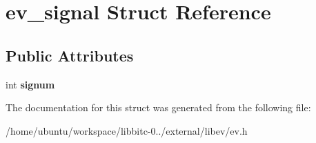 \hypertarget{structev__signal}{\section{ev\-\_\-signal Struct Reference}
\label{structev__signal}
}
\subsection*{Public Attributes}
\begin{DoxyCompactItemize}
\item 
\hypertarget{structev__signal_a6e2aa67420522727edd77c291bc29cbe}{int {\bfseries signum}}\label{structev__signal_a6e2aa67420522727edd77c291bc29cbe}

\end{DoxyCompactItemize}


The documentation for this struct was generated from the following file\-:\begin{DoxyCompactItemize}
\item 
/home/ubuntu/workspace/libbitc-\/0../external/libev/ev.\-h\end{DoxyCompactItemize}
